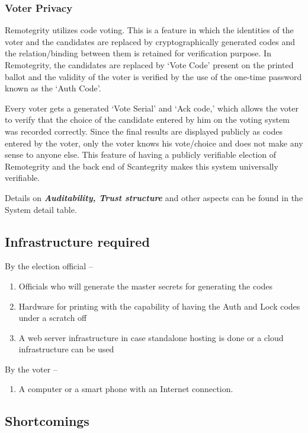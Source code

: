\subsubsection{Voter Privacy}

Remotegrity utilizes code voting. This is a feature in which the
identities of the voter and the candidates are replaced by
cryptographically generated codes and the relation/binding between
them is retained for verification purpose. In Remotegrity, the
candidates are replaced by `Vote Code' present on the printed ballot
and the validity of the voter is verified by the use of the one-time
password known as the `Auth Code'.

Every voter gets a generated `Vote Serial' and `Ack code,' which
allows the voter to verify that the choice of the candidate entered by
him on the voting system was recorded correctly. Since the final
results are displayed publicly as codes entered by the voter, only the
voter knows his vote/choice and does not make any sense to anyone
else. This feature of having a publicly verifiable election of
Remotegrity and the back end of Scantegrity makes this system
universally verifiable.

Details on \textbf{\textit{Auditability, Trust structure }}and other
aspects can be found in the System detail table.

\subsection{Infrastructure required}

By the election official --
\begin{enumerate}
\item Officials who will generate the master secrets for generating
  the codes
\item Hardware for printing with the capability of having the Auth and
  Lock codes under a scratch off
\item A web server infrastructure in case standalone hosting is done
  or a cloud infrastructure can be used
\end{enumerate}
By the voter --
\begin{enumerate}
  \item A computer or a smart phone with an Internet connection.
\end{enumerate}

\subsection{Shortcomings}

